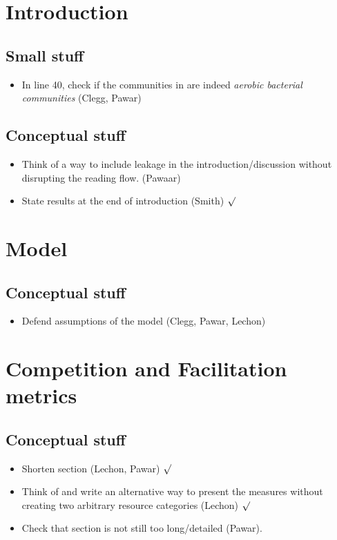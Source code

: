 \documentclass{article}
\begin{document}
    \section{Introduction}
    \subsection{Small stuff}
    \begin{itemize}
        \item In line 40, check if the communities in \citep{Lu2018} are indeed \textit{aerobic bacterial communities} (Clegg, Pawar)
    \end{itemize}
    \subsection{Conceptual stuff}
    \begin{itemize}
        \item Think of a way to include leakage in the introduction/discussion without disrupting the reading flow. (Pawaar)
        \item State results at the end of introduction (Smith) $\surd$
    \end{itemize}
    \section{Model}
    \subsection{Conceptual stuff}
    \begin{itemize}
        \item Defend assumptions of the model (Clegg, Pawar, Lechon)
    \end{itemize}
    \section{Competition and Facilitation metrics}
    \subsection{Conceptual stuff}
    \begin{itemize}
        \item Shorten section (Lechon, Pawar) $\surd$
        \item Think of and write an alternative way to present the measures without creating two arbitrary resource categories (Lechon) $\surd$
        \item Check that section is not still too long/detailed (Pawar).
    \end{itemize}
\end{document}
